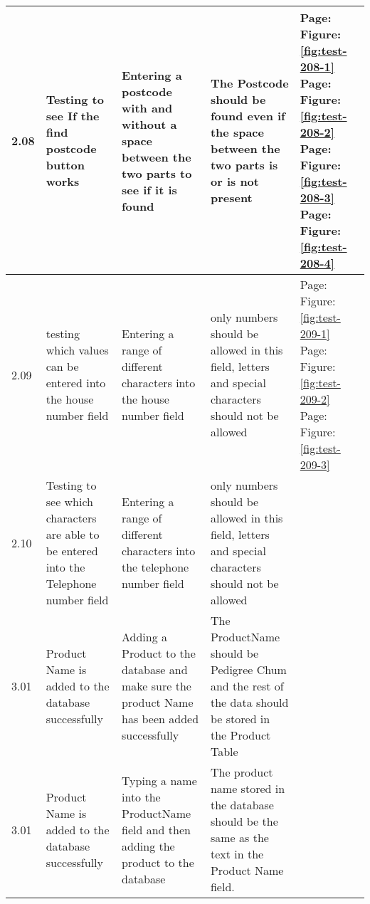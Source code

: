 \begin{flushleft}
\begin{longtable}{|p{1cm}|p{2.5cm}|p{2.5cm}|p{2cm}|p{2cm}|}
	\rowcolor{light-grey}2.08 & Testing to see If the find postcode button works & Entering a postcode with and without a space between the two parts to see if it is found &The Postcode should be found even if the space between the two parts is or is not present & Page: \pageref{fig:test-208-1} \newline Figure: \ref{fig:test-208-1} \newline \newline  Page: \pageref{fig:test-208-2} \newline Figure: \ref{fig:test-208-2} \newline \newline Page: \pageref{fig:test-208-3} \newline Figure: \ref{fig:test-208-3} \newline \newline Page: \pageref{fig:test-208-4} \newline Figure: \ref{fig:test-208-4}\\ \hline
	\rowcolor{light-grey}2.09 & testing which values can be entered into the house number field & Entering a range of different characters into the house number field & only numbers should be allowed in this field, letters and special characters should not be allowed &  Page: \pageref{fig:test-209-1} \newline Figure: \ref{fig:test-209-1} \newline \newline Page: \pageref{fig:test-209-2} \newline Figure: \ref{fig:test-209-2} \newline \newline Page: \pageref{fig:test-209-3} \newline Figure: \ref{fig:test-209-3}\\ \hline
	\rowcolor{light-grey}2.10 & Testing to see which characters are able to be entered into the Telephone number field & Entering a range of different characters into the telephone number field & only numbers should be allowed in this field, letters and special characters should not be allowed & \\ \hline
	\rowcolor{dark-grey}3.01 & Product Name is added to the database successfully & Adding a Product to the database and make sure the product Name has been added successfully & The ProductName should be Pedigree Chum and the rest of the data should be stored in the Product Table & \\ \hline
	\rowcolor{light-grey}3.01 & Product Name is added to the database successfully & Typing a name into the ProductName field and then adding the product to the database & The product name stored in the database should be the same as the text in the Product Name field.& \\ \hline

\end{longtable}
\end{flushleft}
